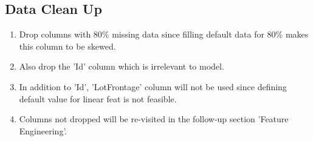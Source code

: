 \documentclass[11pt]{article}
\providecommand{\tightlist}{%
      \setlength{\itemsep}{0pt}\setlength{\parskip}{0pt}}
\begin{document}
    \subsection{Data Clean Up}\label{data-clean-up}

    \begin{enumerate}
\def\labelenumi{\arabic{enumi})}
\tightlist
\item
  Drop columns with 80\% missing data since filling default data for
  80\% makes this column to be skewed. 
\item
  Also drop the 'Id' column which is irrelevant to model. 
\item
  In addition to 'Id', 'LotFrontage' column will not be used since
  defining default value for linear feat is not feasible.
\item
  Columns not dropped will be re-visited in the follow-up section
  'Feature Engineering'. 
\end{enumerate}
\end{document}
